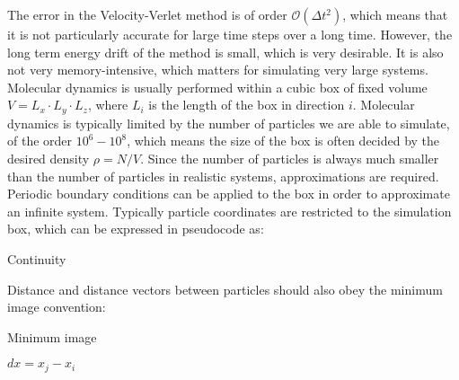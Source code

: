 The error in the Velocity-Verlet method is of order
$\mathcal{O}(\Delta t^2)$, which means that it is
not particularly accurate for large time steps
over a long time. However, the long term
energy drift of the method is small, which is very desirable.
It is also not very memory-intensive, which matters
for simulating very large systems.
\newline
\newline
Molecular dynamics is usually performed within
a cubic box of fixed volume $V = L_x \cdot L_y \cdot L_z$,
where $L_i$ is the length of the box in direction $i$.
Molecular dynamics is typically limited by the number
of particles we are able to simulate, of the order
$10^6 - 10^8$, which means the size of the box
is often decided by the desired density $\rho = N / V$.
Since the number of particles is always much smaller
than the number of particles in realistic systems,
approximations are required. Periodic boundary conditions
can be applied to the box in order to approximate
an infinite system. Typically particle coordinates are restricted
to the simulation box, which can be expressed in pseudocode as:

\begin{algorithm}[H]
\caption{Continuity}
    \begin{algorithmic}
        \EndIf
        \EndIf
    \end{algorithmic}
\end{algorithm}

Distance and distance vectors between particles
should also obey the minimum image convention:

\begin{algorithm}[H]
\caption{Minimum image}
    \begin{algorithmic}
        \State $dx = x_j - x_i$
        \EndIf
        \EndIf
    \end{algorithmic}
\end{algorithm}


